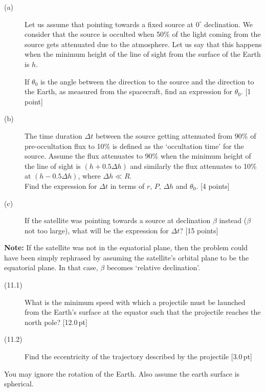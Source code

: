 \begin{description}
\item[(a)] Let us assume that pointing towards a fixed source at $0^\circ$
  declination. We consider that the source is occulted when 50\% of the light
  coming from the source gets attenuated due to the atmosphere. Let us say
  that this happens when the minimum height of the line of sight from the
  surface of the Earth is $h$.

  If $\theta_0$ is the angle between the direction to the source and the
  direction to the Earth, as measured from the spacecraft, find an expression
  for $\theta_0$. \hfill[1 point]
\item[(b)] The time duration $\Delta t$ between the source getting attenuated
  from 90\% of pre-occultation flux to 10\% is defined as the `occultation
  time' for the source. Assume the flux attenuates to 90\% when the minimum
  height of the line of sight is $(h + 0.5\Delta h)$ and similarly the flux
  attenuates to 10\% at $(h - 0.5\Delta h)$, where $\Delta h \ll R$.\\
  Find the expression for $\Delta t$ in terms of $r$, $P$, $\Delta h$ and
  $\theta_0$. \hfill[4 points]
\item[(c)] If the satellite was pointing towards a source at declination
  $\beta$ instead ($\beta$ not too large), what will be the expression for
  $\Delta t$? \hfill[15 points]
\end{description}

\textbf{Note:} If the satellite was not in the equatorial plane, then the
problem could have been simply rephrased by assuming the satellite's orbital
plane to be the equatorial plane. In that case, $\beta$ becomes `relative
declination'.

\begin{description}
\item[(11.1)] What is the minimum speed with which a projectile must be
  launched from the Earth's surface at the equator such that the projectile
  reaches the north pole? \hfill[12.0\,pt]
\item[(11.2)] Find the eccentricity of the trajectory described by the
  projectile \hfill[3.0\,pt]
\end{description}

You may ignore the rotation of the Earth. Also assume the earth surface is
spherical.

